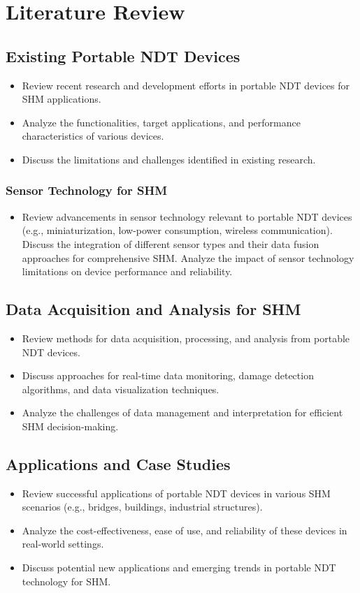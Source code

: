 \documentclass[journal, a4paper]{IEEEtran}
\begin{document}
\section{Literature Review}

\subsection{Existing Portable NDT Devices}
\begin{itemize}
  \item Review recent research and development efforts in portable NDT devices for SHM applications.
  \item Analyze the functionalities, target applications, and performance characteristics of various devices.
  \item Discuss the limitations and challenges identified in existing research.
\end{itemize}

\subsubsection{Sensor Technology for SHM}
\begin{itemize}
  \item Review advancements in sensor technology relevant to portable NDT devices (e.g., miniaturization, low-power consumption, wireless communication).
  Discuss the integration of different sensor types and their data fusion approaches for comprehensive SHM.
  Analyze the impact of sensor technology limitations on device performance and reliability.
\end{itemize}

\subsection{Data Acquisition and Analysis for SHM}
\begin{itemize}
  \item Review methods for data acquisition, processing, and analysis from portable NDT devices.
  \item Discuss approaches for real-time data monitoring, damage detection algorithms, and data visualization techniques.
  \item Analyze the challenges of data management and interpretation for efficient SHM decision-making.
\end{itemize}

\subsection{Applications and Case Studies}
\begin{itemize}
  \item Review successful applications of portable NDT devices in various SHM scenarios (e.g., bridges, buildings, industrial structures).
  \item Analyze the cost-effectiveness, ease of use, and reliability of these devices in real-world settings.
  \item Discuss potential new applications and emerging trends in portable NDT technology for SHM.
\end{itemize}
\end{document}
